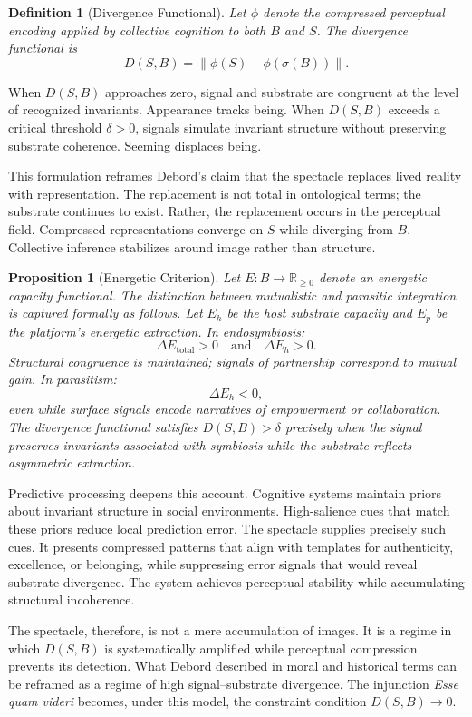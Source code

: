 \documentclass[11pt]{article}
\newtheorem{definition}{Definition}
\newtheorem{proposition}{Proposition}
\begin{document}
\begin{definition}[Divergence Functional]
Let $\phi$ denote the compressed perceptual encoding applied by collective cognition to both $B$ and $S$. The divergence functional is
\[
D(S, B) = \|\phi(S) - \phi(\sigma(B))\|.
\]
\end{definition}

When $D(S,B)$ approaches zero, signal and substrate are congruent at the level of recognized invariants. Appearance tracks being. When $D(S,B)$ exceeds a critical threshold $\delta > 0$, signals simulate invariant structure without preserving substrate coherence. Seeming displaces being.

This formulation reframes Debord's claim that the spectacle replaces lived reality with representation. The replacement is not total in ontological terms; the substrate continues to exist. Rather, the replacement occurs in the perceptual field. Compressed representations converge on $S$ while diverging from $B$. Collective inference stabilizes around image rather than structure.

\begin{proposition}[Energetic Criterion]
Let $E : B \to \mathbb{R}_{\ge 0}$ denote an energetic capacity functional. The distinction between mutualistic and parasitic integration is captured formally as follows. Let $E_h$ be the host substrate capacity and $E_p$ be the platform's energetic extraction. In endosymbiosis:
\[
\Delta E_{\mathrm{total}} > 0 \quad \text{and} \quad \Delta E_h > 0.
\]
Structural congruence is maintained; signals of partnership correspond to mutual gain. In parasitism:
\[
\Delta E_h < 0,
\]
even while surface signals encode narratives of empowerment or collaboration. The divergence functional satisfies $D(S,B) > \delta$ precisely when the signal preserves invariants associated with symbiosis while the substrate reflects asymmetric extraction.
\end{proposition}

Predictive processing deepens this account. Cognitive systems maintain priors about invariant structure in social environments. High-salience cues that match these priors reduce local prediction error. The spectacle supplies precisely such cues. It presents compressed patterns that align with templates for authenticity, excellence, or belonging, while suppressing error signals that would reveal substrate divergence. The system achieves perceptual stability while accumulating structural incoherence.

The spectacle, therefore, is not a mere accumulation of images. It is a regime in which $D(S,B)$ is systematically amplified while perceptual compression prevents its detection. What Debord described in moral and historical terms can be reframed as a regime of high signal--substrate divergence. The injunction \textit{Esse quam videri} becomes, under this model, the constraint condition $D(S,B) \to 0$.
\end{document}
